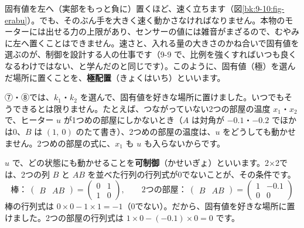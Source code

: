固有値を左へ（実部をもっと負に）置くほど、速く立ちます（図\ref{bk:9-10:fig-erabu}）。でも、そのぶん手を大きく速く動かさなければなりません。本物のモーターには出せる力の上限があり、センサーの値には雑音がまざるので、むやみに左へ置くことはできません。速さと、入れる量の大きさのかね合いで固有値を選ぶのが、制御を設計する人の仕事です（9-9 で、比例を強くすればいつも良くなるわけではない、と学んだのと同じです）。このように、固有値（極）を選んだ場所に置くことを、\textbf{極配置}（きょくはいち）といいます。

\begin{seikaku}
⑦・⑧では、$k_1$・$k_2$ を選んで、固有値を好きな場所に置けました。いつでもそうできるとは限りません。たとえば、つながっていない2つの部屋の温度 $x_1$・$x_2$ で、ヒーター $u$ が1つめの部屋にしかないとき（$A$ は対角が $-0.1$・$-0.2$ でほかは0、$B$ は $(1,\ 0)$ のたて書き）、2つめの部屋の温度は、$u$ をどうしても動かせません。2つめの部屋の式に、$x_1$ も $u$ も入らないからです。

$u$ で、どの状態にも動かせることを\textbf{可制御}（かせいぎょ）といいます。2×2では、2つの列 $B$ と $AB$ を並べた行列の行列式が0でないことが、その条件です。
\[ \text{棒}：\ \begin{pmatrix}B&AB\end{pmatrix}=\begin{pmatrix}0&1\\1&0\end{pmatrix},\qquad \text{2つの部屋}：\ \begin{pmatrix}B&AB\end{pmatrix}=\begin{pmatrix}1&-0.1\\0&0\end{pmatrix} \]
棒の行列式は $0\times0-1\times1=-1$（0でない）。だから、固有値を好きな場所に置けました。2つの部屋の行列式は $1\times0-(-0.1)\times0=0$ です。
\end{seikaku}


